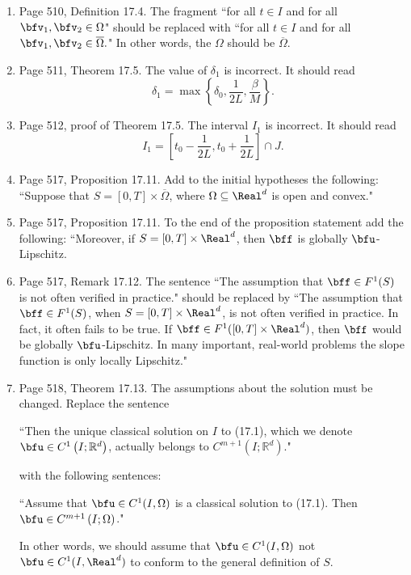 \documentclass{book}
\begin{document}
	\begin{enumerate}
	\item
Page 510, Definition 17.4. The fragment ``for all $t\in I$ and for all $\bfv_1, \bfv_2\in \Omega$" should be replaced with  ``for all $t\in I$ and for all $\bfv_1, \bfv_2\in \overline{\Omega}.$" In other words, the $\Omega$ should be $\overline{\Omega}$.

	\item
Page 511, Theorem 17.5. The value of $\delta_1$ is incorrect. It should read
	\[
\delta_1 = \max\left\{\delta_0, \frac{1}{2L} , \frac{\beta}{M} \right\}.
	\]
	
	\item
Page 512, proof of Theorem 17.5. The interval $I_1$ is incorrect. It should read
	\[
I_1 = \left[t_0 - \frac{1}{2L} , t_0 +\frac{1}{2L} \right]\cap J	.
	\]

	\item
Page 517, Proposition 17.11. Add to the initial hypotheses the following: ``Suppose that $S = [0,T]\times \overline\Omega$, where $\Omega \subseteq\Real^d$ is open and convex."

	\item
Page 517, Proposition 17.11. To the end of the proposition statement add the following: ``Moreover, if $S = [0,T]\times \Real^d$, then $\bff$ is globally $\bfu$-Lipschitz.

	\item
Page 517, Remark 17.12. The sentence ``The assumption that $\bff\in F^1(S)$ is not often verified in practice." should be replaced by ``The assumption that $\bff\in F^1(S)$, when $S = [0,T] \times \Real^d$, is not often verified in practice. In fact, it often fails to be true. If $\bff\in F^1([0,T]\times \Real^d)$, then $\bff$ would be globally $\bfu$-Lipschitz. In many important, real-world problems the slope function is only locally Lipschitz." 

	\item
Page 518, Theorem 17.13. The assumptions about the solution must be changed. Replace the sentence 

	\medskip

\hspace{0.5in}``Then the unique classical solution on $I$ to (17.1), which we denote $\bfu\in C^1\left(I;\mathbb{R}^d\right)$, actually belongs to $C^{m+1}\left(I;\mathbb{R}^d\right)$."

	\medskip

with the following sentences:

	\medskip

\hspace{0.5in}``Assume that $\bfu\in C^1(I,\Omega)$ is a classical solution to (17.1). Then $\bfu \in C^{m+1}\left(I;\Omega\right)$."

	\medskip

In other words, we should assume that $\bfu\in C^1(I,\Omega)$ not $\bfu \in  C^1(I,\Real^d)$ to conform to the general definition of $S$.


	\end{enumerate}
	
\end{document}
